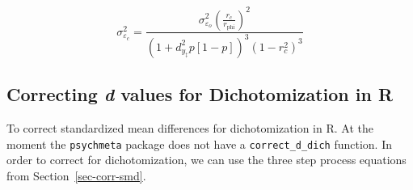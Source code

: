 \documentclass[
  letterpaper,
  DIV=11,
  numbers=noendperiod]{scrreprt}
\begin{document}
\[
\sigma^2_{\varepsilon_c} = \frac {\sigma^2_{\varepsilon_o} \left(\frac{r_c}{r_\text{phi}}\right)^2} {\left(1+d_{y_\ddagger}^2p[1-p]\right)^3(1-r_c^2)^3}
\]

\hypertarget{correcting-d-values-for-dichotomization-in-r}{%
\subsection{\texorpdfstring{Correcting \emph{d} values for
Dichotomization in
R}{Correcting d values for Dichotomization in R}}\label{correcting-d-values-for-dichotomization-in-r}}

To correct standardized mean differences for dichotomization in R. At
the moment the \texttt{psychmeta} package does not have a
\texttt{correct\_d\_dich} function. In order to correct for
dichotomization, we can use the three step process equations from
Section~\ref{sec-corr-smd}.
\end{document}
